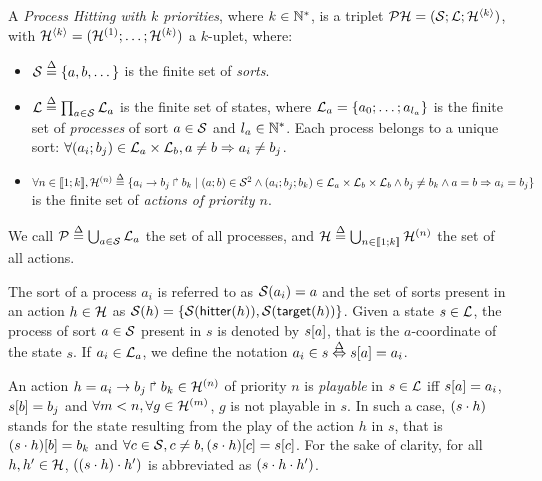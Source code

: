 \begin{definition} 
  A \emph{Process Hitting with $k$ priorities}, where $k \in \mathbb{N}^*$, is a triplet $\mathcal{PH} = (\mathcal{S}; \mathcal{L}; \mathcal{H}^{\langle k \rangle})$, with $\mathcal{H}^{\langle k \rangle} = (\mathcal{H}^{(1)}; \dots; \mathcal{H}^{(k)})$ a $k$-uplet, where:
  \begin{itemize}
    \item $\mathcal{S} \stackrel{\Delta}= \{a,b,\dots\}$ is the finite set of \emph{sorts}.
    \item $\mathcal{L} \stackrel{\Delta}= \prod_{a \in \mathcal{S}} \mathcal{L}_a$ is the finite set of states, where $\mathcal{L}_a = \{a_0 ; \ldots ; a_{l_a}\}$ is the finite set of \emph{processes} of sort $a \in \mathcal{S}$ and $l_a \in \mathbb{N}^*$. Each process belongs to a unique sort: $\forall (a_i; b_j) \in \mathcal{L}_a \times \mathcal{L}_b, a \neq b \Rightarrow a_i \neq b_j$.
    \item $\forall n \in \llbracket 1; k \rrbracket, \mathcal{H}^{(n)} \stackrel{\Delta}= \{a_i\rightarrow b_j\Rsh b_k \mid (a; b) \in \mathcal{S}^2 \wedge (a_i; b_j; b_k) \in \mathcal{L}_a \times \mathcal{L}_b \times \mathcal{L}_b \wedge b_j \neq b_k \wedge a = b \Rightarrow a_i = b_j \}$ is the finite set of \emph{actions of priority $n$}.
  \end{itemize}
  We call $\mathcal{P} \stackrel{\Delta}= \bigcup_{a \in \mathcal{S}} \mathcal{L}_a$ the set of all processes, and $\mathcal{H} \stackrel{\Delta}= \bigcup_{n \in \llbracket 1; k \rrbracket} \mathcal{H}^{(n)}$ the set of all actions.
\end{definition}

\noindent
The sort of a process $a_i$ is referred to as $\mathcal{S}(a_i)=a$ and the set of sorts present in an action $h\in\mathcal{H}$ as $\mathcal{S}(h) = \{\mathcal{S}(\mathsf{hitter}(h)),\mathcal{S}(\mathsf{target}(h))\}$.
Given a state $s\in \mathcal{L}$, the process of sort $a\in\mathcal{S}$ present in $s$ is denoted by ${s[a]}$, that is the $a$-coordinate of the state $s$.
If $a_i\in \mathcal{L}_a$, we define the notation $a_i\in s \stackrel{\Delta}\Leftrightarrow {s[a]}=a_i$.

An action $h = a_i\rightarrow b_j\Rsh b_k \in \mathcal{H}^{(n)}$ of priority $n$ is \emph{playable} in $s \in \mathcal{L}$ iff ${s[a]} = a_i$, ${s[b]} = b_j$ and $\forall m < n, \forall g \in \mathcal{H}^{(m)}$, $g$ is not playable in $s$.
%
In such a case, $(s \cdot h)$ stands for the state resulting from the play of the action $h$ in $s$, that is ${(s \cdot h)[b]} = b_k$ and $\forall c\in\mathcal{S}, c\neq b, {(s\cdot h)[c]} = {s[c]}$.
For the sake of clarity, for all $h, h'\in\mathcal{H}$, $((s\cdot h)\cdot h')$ is abbreviated as $(s\cdot h\cdot h')$.

